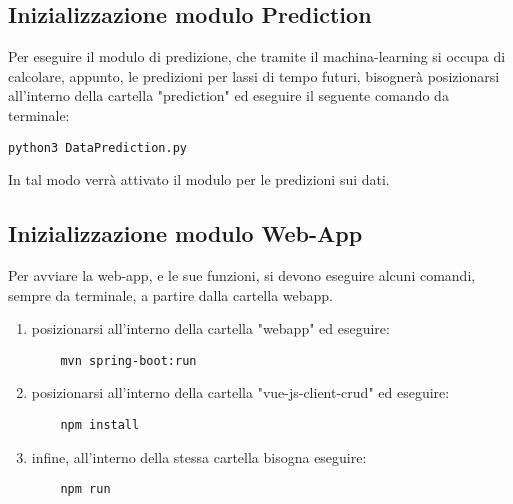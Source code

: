 \subsection{Inizializzazione modulo Prediction}\label{RequisitiDiSistemaEdInstallazioneInstallazioneInizializzazioneModuloPrediction}
Per eseguire il modulo di predizione, che tramite il machina-learning si occupa di calcolare, appunto, le predizioni per lassi di tempo futuri, bisognerà posizionarsi all'interno della cartella "prediction" ed eseguire il seguente comando da terminale:

\begin{lstlisting}
python3 DataPrediction.py
\end{lstlisting}
In tal modo verrà attivato il modulo per le predizioni sui dati.


\subsection{Inizializzazione modulo Web-App}\label{RequisitiDiSistemaEdInstallazioneInstallazioneInizializzazioneModuloWebApp}
Per avviare la web-app, e le sue funzioni, si devono eseguire alcuni comandi, sempre da terminale, a partire dalla cartella webapp.
\begin{enumerate}
	\item posizionarsi all'interno della cartella "webapp" ed eseguire:
	\begin{lstlisting}
	mvn spring-boot:run
	\end{lstlisting}
	\item posizionarsi all'interno della cartella "vue-js-client-crud" ed eseguire:
	\begin{lstlisting}
	npm install
	\end{lstlisting}
	\item infine, all'interno della stessa cartella bisogna eseguire:
	\begin{lstlisting}
	npm run
	\end{lstlisting}
\end{enumerate}
